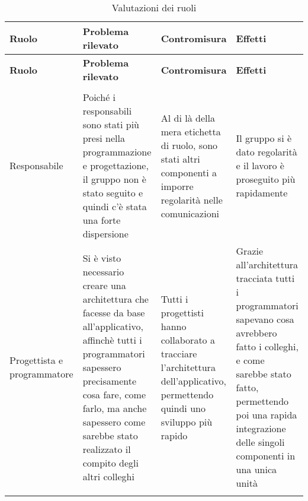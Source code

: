 \documentclass[../piano_di_qualifica.tex]{subfiles}
\begin{document}
\begin{center}
	\begin{longtable}{|p{2.5cm}|p{4.5cm}|p{4.5cm}|p{4.5cm}|}
		\hline
		\rowcolor{lightgray}
		{\textbf{Ruolo}} & {\textbf{Problema rilevato}} & {\textbf{Contromisura}} & {\textbf{Effetti}}  \\
		\hline
		\endfirsthead
		\hline
		\rowcolor{lightgray}
		{\textbf{Ruolo}} & {\textbf{Problema rilevato}} & {\textbf{Contromisura}} & {\textbf{Effetti}} \\
		\hline
		\endhead

		\hline
		\rowcolor{white}
		\multicolumn{3}{|c|}{\emph{Continua alla pagina successiva...}} \\
		\hline
		\endfoot
		\endlastfoot

		Responsabile & Poiché i responsabili sono stati più presi nella programmazione e progettazione, il gruppo non è stato seguito e quindi c’è stata una forte dispersione  & Al di là della mera etichetta di ruolo, sono stati altri componenti a imporre regolarità nelle comunicazioni & Il gruppo si è dato regolarità e il lavoro è proseguito più rapidamente \\
		Progettista e programmatore & Si è visto necessario creare una architettura che facesse da base all’applicativo, affinchè tutti i programmatori sapessero precisamente cosa fare, come farlo, ma anche sapessero come sarebbe stato realizzato il compito degli altri colleghi & Tutti i progettisti hanno collaborato a tracciare l’architettura dell’applicativo, permettendo quindi uno sviluppo più rapido & Grazie all’architettura tracciata tutti i programmatori sapevano cosa avrebbero fatto i colleghi, e  come sarebbe stato fatto, permettendo poi una rapida integrazione delle singoli componenti in una unica unità  \\

		\hline
		\rowcolor{white}
		\caption{Valutazioni dei ruoli}
	\end{longtable}
\end{center}
\end{document}
